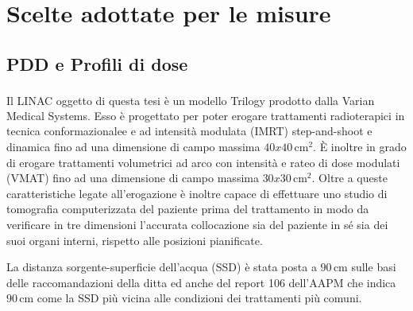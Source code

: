 \section{Scelte adottate per le misure}
\subsection{PDD e Profili di dose}
Il LINAC oggetto di questa tesi è un modello Trilogy\textsuperscript{\textcopyright} prodotto dalla Varian Medical Systems. Esso è progettato per poter erogare trattamenti radioterapici in tecnica conformazionalee e ad intensità modulata (IMRT) step-and-shoot e dinamica fino ad una dimensione di campo massima $40x40\,$cm$^2$. \`E inoltre in grado di erogare trattamenti volumetrici ad arco con intensità e rateo di dose modulati (VMAT) fino ad una dimensione di campo massima $30x30\,$cm$^2$. Oltre a queste caratteristiche legate all'erogazione è inoltre capace di effettuare uno studio di tomografia computerizzata del paziente prima del trattamento in modo da verificare in tre dimensioni l'accurata collocazione sia del paziente in sé sia dei suoi organi interni, rispetto alle posizioni pianificate.

La distanza sorgente-superficie dell'acqua (SSD) è stata posta a $90\,$cm sulle basi delle raccomandazioni della ditta ed anche del report 106 dell'AAPM \cite{Das2008a} che indica $90\,$cm come la SSD più vicina alle condizioni dei trattamenti più comuni.

